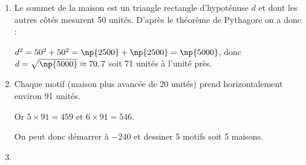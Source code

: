 \documentclass[10pt]{article}
\begin{document}
\begin{enumerate}
\item  %
Le sommet de la maison est un triangle rectangle d'hypoténuse $d$ et dont les autres côtés mesurent 50 unités. D'après le théorème de Pythagore on a donc :

$d^2 = 50^2 + 50^2 = \np{2500} + \np{2500} = \np{5000}$, donc $d = \sqrt{\np{5000}} \approx 70,7$ soit 71 unités à l'unité près. 

\item  %

Chaque motif (maison plus avancée de 20 unités) prend horizontalement environ 91 unités.

Or $5 \times 91 = 459$ et $6 \times 91 = 546$.

On peut donc démarrer à $- 240$ et dessiner 5 motifs soit 5 maisons.
%


\item %


\end{enumerate}
\end{document}
